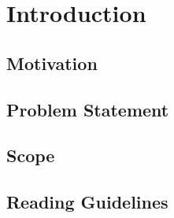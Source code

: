 \section{Introduction}

\subsection{Motivation}


\subsection{Problem Statement}


\subsection{Scope}


\subsection{Reading Guidelines}
